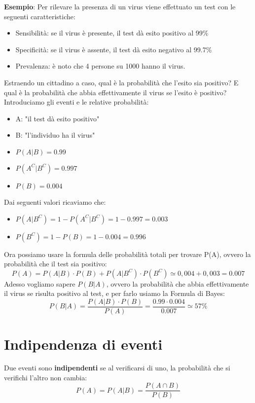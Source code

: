 \begin{tcolorbox}
    \textbf{Esempio}: Per rilevare la presenza di un virus viene effettuato un test con le seguenti caratteristiche: 
    \begin{itemize}
        \item Sensibilità: se il virus è presente, il test dà esito positivo al 99\%
        \item Specificità: se il virus è assente, il test dà esito negativo al 99.7\%
        \item Prevalenza: è noto che 4 persone su 1000 hanno il virus.
    \end{itemize}
    Estraendo un cittadino a caso, qual è la probabilità che l'esito sia positivo? E qual è la probabilità che abbia effettivamente il virus se l'esito è positivo? \newline
    Introduciamo gli eventi e le relative probabilità:
    \begin{itemize}
        \item A: "il test dà esito positivo"
        \item B: "l'individuo ha il virus"
        \item $P(A | B)= 0.99$
        \item $P(A^C | B^C) = 0.997$
        \item $P(B) = 0.004$
    \end{itemize}
    Dai seguenti valori ricaviamo che:
    \begin{itemize}
        \item $P(A | B^C) = 1 - P(A^C | B^C) = 1 - 0.997 = 0.003 $
        \item $P(B^C) = 1 - P(B) = 1 - 0.004 = 0.996$
    \end{itemize}
    Ora possiamo usare la formula delle probabilità totali per trovare P(A), ovvero la probabilità che il test sia positivo: $$P(A) = P(A | B) \cdot P(B) + P(A | B^C) \cdot P(B^C) \simeq 0,004 + 0,003 = 0.007 $$
    Adesso vogliamo sapere $P(B | A)$, ovvero la probabilità che abbia effettivamente il virus se risulta positivo al test, e per farlo usiamo la Formula di Bayes: $$P(B | A) = \dfrac{P(A | B) \cdot P(B)}{P(A)} = \dfrac{0.99 \cdot 0.004 }{0.007} \simeq 57\%$$
\end{tcolorbox} 
    
\section{Indipendenza di eventi}

Due eventi sono \textbf{indipendenti} se al verificarsi di uno, la probabilità che si verifichi l'altro non cambia: $$P(A) = P(A | B) = \dfrac{P(A \cap B)}{P(B)}$$

